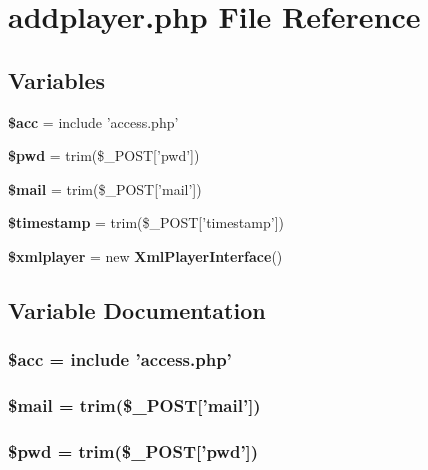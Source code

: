 \section{addplayer.php File Reference}
\label{addplayer_8php}


\subsection*{Variables}
\begin{CompactItemize}
\item 
{\bf \$acc} = include 'access.php'
\item 
{\bf \$pwd} = trim(\$\_\-POST['pwd'])
\item 
{\bf \$mail} = trim(\$\_\-POST['mail'])
\item 
{\bf \$timestamp} = trim(\$\_\-POST['timestamp'])
\item 
{\bf \$xmlplayer} = new {\bf Xml\-Player\-Interface}()
\end{CompactItemize}


\subsection{Variable Documentation}
\subsubsection{\setlength{\rightskip}{0pt plus 5cm}\$acc = include 'access.php'}\label{addplayer_8php_542926c588a05eb69553d79c83cf73da}


\subsubsection{\setlength{\rightskip}{0pt plus 5cm}\$mail = trim(\$\_\-POST['mail'])}\label{addplayer_8php_c409786c163a1974d1e24a6767a95166}


\subsubsection{\setlength{\rightskip}{0pt plus 5cm}\$pwd = trim(\$\_\-POST['pwd'])}\label{addplayer_8php_12e4252e778952d356721bc655cff8c8}


